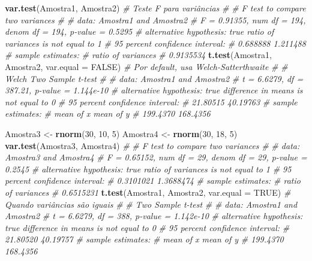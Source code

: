 \documentclass[
]{book}
\newenvironment{Shaded}{\begin{snugshade}}{\end{snugshade}}
\newcommand{\CommentTok}[1]{\textcolor[rgb]{0.56,0.35,0.01}{\textit{#1}}}
\newcommand{\DataTypeTok}[1]{\textcolor[rgb]{0.13,0.29,0.53}{#1}}
\newcommand{\DecValTok}[1]{\textcolor[rgb]{0.00,0.00,0.81}{#1}}
\newcommand{\KeywordTok}[1]{\textcolor[rgb]{0.13,0.29,0.53}{\textbf{#1}}}
\newcommand{\NormalTok}[1]{#1}
\newcommand{\OtherTok}[1]{\textcolor[rgb]{0.56,0.35,0.01}{#1}}
\newcommand{\StringTok}[1]{\textcolor[rgb]{0.31,0.60,0.02}{#1}}
\begin{document}
\begin{Shaded}
\begin{Highlighting}[]
\KeywordTok{var.test}\NormalTok{(Amostra1, Amostra2) }\CommentTok{# Teste F para variâncias}
\CommentTok{# }
\CommentTok{# 	F test to compare two variances}
\CommentTok{# }
\CommentTok{# data:  Amostra1 and Amostra2}
\CommentTok{# F = 0.91355, num df = 194, denom df = 194, p-value = 0.5295}
\CommentTok{# alternative hypothesis: true ratio of variances is not equal to 1}
\CommentTok{# 95 percent confidence interval:}
\CommentTok{#  0.688888 1.211488}
\CommentTok{# sample estimates:}
\CommentTok{# ratio of variances }
\CommentTok{#          0.9135534}
\KeywordTok{t.test}\NormalTok{(Amostra1, Amostra2, }\DataTypeTok{var.equal =} \OtherTok{FALSE}\NormalTok{) }\CommentTok{# Por default, usa Welch-Satterthwaite}
\CommentTok{# }
\CommentTok{# 	Welch Two Sample t-test}
\CommentTok{# }
\CommentTok{# data:  Amostra1 and Amostra2}
\CommentTok{# t = 6.6279, df = 387.21, p-value = 1.144e-10}
\CommentTok{# alternative hypothesis: true difference in means is not equal to 0}
\CommentTok{# 95 percent confidence interval:}
\CommentTok{#  21.80515 40.19763}
\CommentTok{# sample estimates:}
\CommentTok{# mean of x mean of y }
\CommentTok{#  199.4370  168.4356}

\NormalTok{Amostra3 <-}\StringTok{ }\KeywordTok{rnorm}\NormalTok{(}\DecValTok{30}\NormalTok{, }\DecValTok{10}\NormalTok{, }\DecValTok{5}\NormalTok{)}
\NormalTok{Amostra4 <-}\StringTok{ }\KeywordTok{rnorm}\NormalTok{(}\DecValTok{30}\NormalTok{, }\DecValTok{18}\NormalTok{, }\DecValTok{5}\NormalTok{)}
\KeywordTok{var.test}\NormalTok{(Amostra3, Amostra4)}
\CommentTok{# }
\CommentTok{# 	F test to compare two variances}
\CommentTok{# }
\CommentTok{# data:  Amostra3 and Amostra4}
\CommentTok{# F = 0.65152, num df = 29, denom df = 29, p-value = 0.2545}
\CommentTok{# alternative hypothesis: true ratio of variances is not equal to 1}
\CommentTok{# 95 percent confidence interval:}
\CommentTok{#  0.3101021 1.3688474}
\CommentTok{# sample estimates:}
\CommentTok{# ratio of variances }
\CommentTok{#          0.6515231}
\KeywordTok{t.test}\NormalTok{(Amostra1, Amostra2, }\DataTypeTok{var.equal =} \OtherTok{TRUE}\NormalTok{) }\CommentTok{# Quando variâncias são iguais}
\CommentTok{# }
\CommentTok{# 	Two Sample t-test}
\CommentTok{# }
\CommentTok{# data:  Amostra1 and Amostra2}
\CommentTok{# t = 6.6279, df = 388, p-value = 1.142e-10}
\CommentTok{# alternative hypothesis: true difference in means is not equal to 0}
\CommentTok{# 95 percent confidence interval:}
\CommentTok{#  21.80520 40.19757}
\CommentTok{# sample estimates:}
\CommentTok{# mean of x mean of y }
\CommentTok{#  199.4370  168.4356}
\end{Highlighting}
\end{Shaded}
\end{document}

